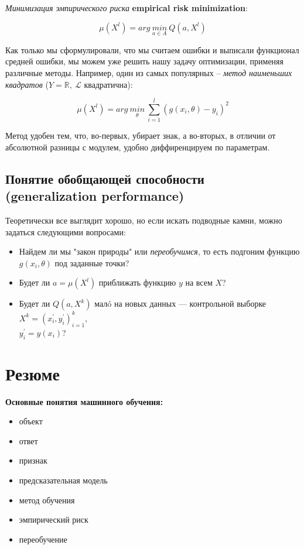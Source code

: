 \documentclass{article}
\begin{document}
\textit{Минимизация эмпирического риска} \textbf{empirical risk minimization}:

$$\mu(X^l) = arg\ \underset{a \in A}{min}\ Q(a, X^l)$$

Как только мы сформулировали, что мы считаем ошибки и выписали функционал средней ошибки, мы можем уже решить нашу задачу оптимизации, применяя различные методы. Например, один из самых популярных -- \textit{метод наименьших квадратов} ($Y = \mathbb{R},\ \mathscr{L}$ квадратична):

$$\mu(X^l) = arg\ \underset{\theta}{min}\ \sum\limits_{i = 1}^l (g(x_i, \theta) - y_i)^2$$

Метод удобен тем, что, во-первых, убирает знак, а во-вторых, в отличии от абсолютной разницы с модулем, удобно диффиренцируем по параметрам. 

\subsection{Понятие обобщающей способности (generalization performance)}

Теоретически все выглядит хорошо, но если искать подводные камни, можно задаться следующими вопросами:

\begin{itemize}
\item Найдем ли мы "закон природы" или \textit{переобучимся}, то есть подгоним функцию $g(x_i, \theta)$ под заданные точки?

\item Будет ли $a = \mu(X^l)$ приближать функцию $y$ на всем $X$?

\item Будет ли $Q(a, X^k)$ мал\'o на новых данных ---
контрольной выборке $X^k = (x_i^{'}, y_i^{'})_{i = 1}^k$,\\$y_i^{'} = y(x_i)$?

\end{itemize}

\newpage
\section{Резюме}

\textbf{Основные понятия машинного обучения:}
\begin{itemize}
\item объект
\item ответ
\item признак
\item предсказательная модель
\item метод обучения
\item эмпирический риск
\item переобучение
\end{itemize}
\end{document}
